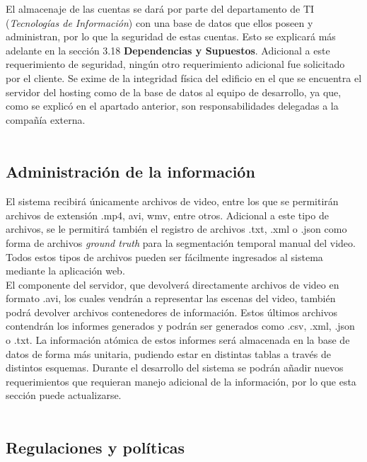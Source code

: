 \documentclass[a4paper]{article}
\newcommand\tab[1][0.55cm]{\hspace*{#1}}
\begin{document}
{ El almacenaje de las cuentas se dará por parte del departamento de TI (\textit{Tecnologías de Información}) con una base de datos que ellos poseen y administran, por lo que la seguridad de estas cuentas. Esto se explicará más adelante en la sección 3.18 \textbf{Dependencias y Supuestos}.   Adicional a este requerimiento de seguridad, ningún otro requerimiento adicional fue solicitado por el cliente. Se exime de la integridad física del edificio en el que se encuentra el servidor del hosting como de la base de datos al equipo de desarrollo, ya que, como se explicó en el apartado anterior, son responsabilidades delegadas a la compañía externa. \\ \\
 
 
\color{Blue}
\subsection{Administración de la información}
\color{black}
\justify 

	\tab El sistema recibirá únicamente archivos de video, entre los que se permitirán archivos de extensión .mp4, avi, wmv, entre otros. Adicional a este tipo de archivos, se le permitirá también el registro de archivos .txt, .xml o .json como forma de archivos \textit{ground truth} para la segmentación temporal manual del video. Todos estos tipos de archivos pueden ser fácilmente ingresados al sistema mediante la aplicación web. \\ 
    
    El componente del servidor, que devolverá  directamente  archivos de video en formato .avi, los cuales vendrán a representar las escenas del video, también podrá devolver archivos contenedores de información. Estos últimos archivos contendrán los informes generados y podrán ser generados como .csv, .xml, .json o .txt. La información atómica de estos informes será almacenada en la base de datos de forma más unitaria, pudiendo estar en distintas tablas a través de distintos esquemas. Durante el desarrollo del sistema se podrán añadir nuevos requerimientos que requieran manejo adicional de la información, por lo que esta sección puede actualizarse. \\ \\

\color{Blue}
\subsection{Regulaciones y políticas}
\color{black}
\justify 

}
\end{document}
